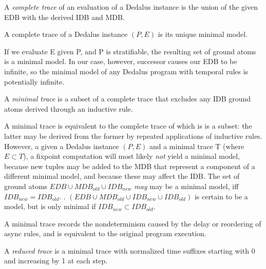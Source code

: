 \begin{definition}
%
A \emph{complete trace} of an evaluation of a Dedalus instance is the union of
the given EDB with the derived IDB and MDB.
%
\end{definition}

\begin{lemma}
%
A complete trace of a Dedalus instance $(P,E)$ is its unique minimal model.
%
\end{lemma}


If we evaluate E given P, and P is stratifiable, the resulting set of ground atoms is a minimal model.
In our case, however, successor causes our EDB to be infinite, so the minimal model of any Dedalus program 
with temporal rules is potentially infinite.  


\begin{definition}
A \emph{minimal trace} is a subset of a complete trace that excludes any IDB ground atoms derived through an inductive
rule.
\end{definition}

A minimal trace is equivalent to the complete trace of which is is a subset: the latter may be derived from the former by repeated
applications of inductive rules.  However, a given a Dedalus instance $(P, E)$ and a minimal trace T (where $E \subset T$), a fixpoint
computation will most likely \emph{not} yield a minimal model, because new tuples may be added to the MDB that represent a component 
of a different minimal model, and because these may affect the IDB.  The set of ground atoms $EDB \cup MDB_{old} \cup IDB_{new}$
\emph{may} may be a minimal model, iff $IDB_{new} = IDB_{old}$.  .  
$(EDB \cup MDB_{old} \cup IDB_{new} \cup IDB_{old})$ is certain to be a model, but is only minimal if $IDB_{new} \subset IDB_{old}$.

A minimal trace records the nondeterminism caused by the delay or reordering of async rules, and
is equivalent to the original program execution.  

\begin{definition}
A \emph{reduced trace} is a minimal trace with normalized time suffixes starting with 0 and increasing by 1 at each step.
\end{definition}


